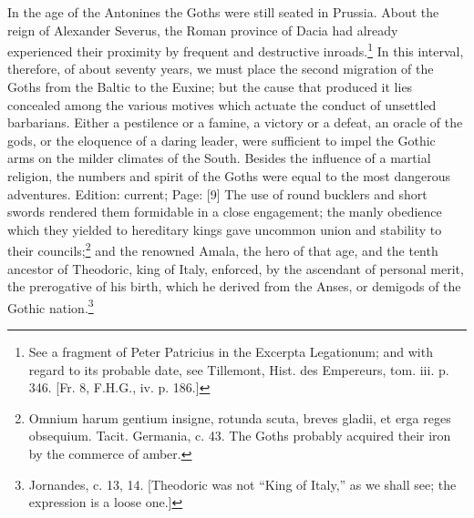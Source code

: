 In the age of the Antonines the Goths were still seated in Prussia. About the reign of Alexander Severus, the Roman province of Dacia had already experienced their proximity by frequent and destructive inroads.\footnote{See a fragment of Peter Patricius in the Excerpta Legationum; and with regard to its probable date, see Tillemont, Hist. des Empereurs, tom. iii. p. 346. [Fr. 8, F.H.G., iv. p. 186.]} In this interval, therefore, of about seventy years, we must place the second migration of the Goths from the Baltic to the Euxine; but the cause that produced it lies concealed among the various motives which actuate the conduct of unsettled barbarians. Either a pestilence or a famine, a victory or a defeat, an oracle of the gods, or the eloquence of a daring leader, were sufficient to impel the Gothic arms on the milder climates of the South. Besides the influence of a martial religion, the numbers and spirit of the Goths were equal to the most dangerous adventures. Edition: current; Page: [9] The use of round bucklers and short swords rendered them formidable in a close engagement; the manly obedience which they yielded to hereditary kings gave uncommon union and stability to their councils;\footnote{Omnium harum gentium insigne, rotunda scuta, breves gladii, et erga reges obsequium. Tacit. Germania, c. 43. The Goths probably acquired their iron by the commerce of amber.} and the renowned Amala, the hero of that age, and the tenth ancestor of Theodoric, king of Italy, enforced, by the ascendant of personal merit, the prerogative of his birth, which he derived from the Anses, or demigods of the Gothic nation.\footnote{Jornandes, c. 13, 14. [Theodoric was not \texthebrew{“}King of Italy,\texthebrew{}” as we shall see; the expression is a loose one.]}

